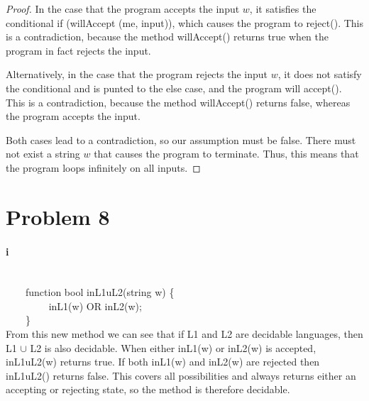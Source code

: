 \documentclass[10pt,letter]{article}
\begin{document}
{\begin{proof}
In the case that the program accepts the input $w$, it satisfies the conditional {\selectfont if (willAccept (me, input))}, which causes the program to {\selectfont reject()}. This is a contradiction, because the method {\selectfont willAccept()} returns true when the program in fact rejects the input.

Alternatively, in the case that the program rejects the input $w$, it does not satisfy the conditional and is punted to the {\selectfont else} case, and the program will {\selectfont accept()}. This is a contradiction, because the method {\selectfont willAccept()} returns false, whereas the program accepts the input.

Both cases lead to a contradiction, so our assumption must be false. There must not exist a string $w$ that causes the program to terminate. Thus, this means that the program loops infinitely on all inputs. 
\end{proof}
\section*{Problem 8}
\paragraph{i}
\ \\
{\selectfont
$\qquad$function bool inL1uL2(string w) \{ \\
$\qquad$$\qquad$  inL1(w) OR inL2(w); \\
$\qquad$\} \\}
From this new method we can see that if L1 and L2 are decidable languages, then L1 $\cup$ L2 is also decidable. When either {\selectfont inL1(w)} or {\selectfont inL2(w)} is accepted, {\selectfont inL1uL2(w)} returns true. If both {\selectfont inL1(w)} and {\selectfont inL2(w)} are rejected then {\selectfont inL1uL2()} returns false. This covers all possibilities and always returns either an accepting or rejecting state, so the method is therefore decidable. 

}
\end{document}
